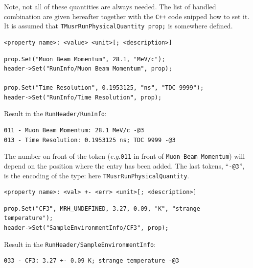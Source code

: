 \documentclass[twoside]{article}
\newcommand{\eg}{\emph{e.g.}\xspace}
\newcommand{\tquant}{\texttt{TMusrRunPhysicalQuantity}\xspace}
\begin{document}
Note, not all of these quantities are always needed. The list of handled combination are given hereafter together with the \verb!C++! code snipped how to set it. It is assumed that \verb!TMusrRunPhysicalQuantity prop;! is somewhere defined.

\begin{leftbar}
\begin{verbatim}
<property name>: <value> <unit>[; <description>]
\end{verbatim}
\end{leftbar}

\begin{shaded}
\begin{verbatim}  
prop.Set("Muon Beam Momentum", 28.1, "MeV/c");
header->Set("RunInfo/Muon Beam Momentum", prop);

prop.Set("Time Resolution", 0.1953125, "ns", "TDC 9999");
header->Set("RunInfo/Time Resolution", prop);
\end{verbatim}
\end{shaded}

\noindent Result in the \texttt{RunHeader/RunInfo}:
\begin{verbatim}
011 - Muon Beam Momentum: 28.1 MeV/c -@3
013 - Time Resolution: 0.1953125 ns; TDC 9999 -@3 
\end{verbatim}

\noindent The number on front of the token (\eg \verb!011! in front of \verb!Muon Beam Momentum!) will depend on the position where the entry has been added. The last tokens, ``\verb!-@3!'', is the encoding of the type: here \tquant.

\noindent\hrulefill

\begin{leftbar}
\begin{verbatim}
<property name>: <val> +- <err> <unit>[; <description>]
\end{verbatim}
\end{leftbar}

\begin{shaded}
\begin{verbatim}  
prop.Set("CF3", MRH_UNDEFINED, 3.27, 0.09, "K", "strange temperature");
header->Set("SampleEnvironmentInfo/CF3", prop);
\end{verbatim}
\end{shaded}

\noindent Result in the \texttt{RunHeader/SampleEnvironmentInfo}:
\begin{verbatim}
033 - CF3: 3.27 +- 0.09 K; strange temperature -@3 
\end{verbatim}
\end{document}
